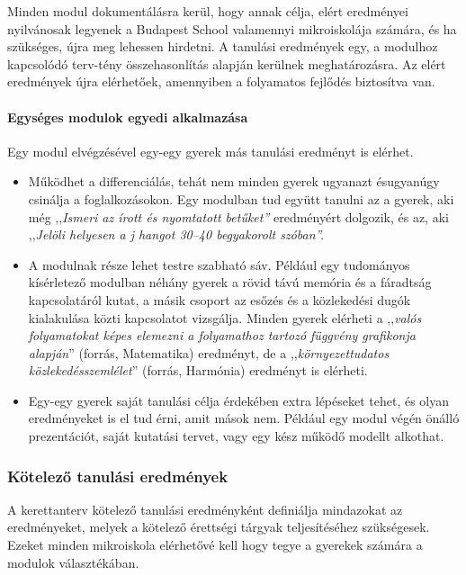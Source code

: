 Minden modul dokumentálásra kerül, hogy annak célja, elért eredményei nyilvánosak legyenek a Budapest School valamennyi mikroiskolája számára, és ha szükséges, újra meg lehessen hirdetni. A tanulási eredmények egy, a modulhoz kapcsolódó terv-tény összehasonlítás alapján kerülnek meghatározásra. Az elért eredmények újra elérhetőek, amennyiben a folyamatos fejlődés biztosítva van.

\paragraph{Egységes modulok egyedi alkalmazása}

Egy modul elvégzésével egy-egy gyerek más tanulási eredményt is elérhet.

\begin{itemize}
      \item
            Működhet a differenciálás, tehát nem minden gyerek ugyanazt és\break ugyanúgy csinálja a foglalkozásokon. Egy modulban tud együtt	tanulni az a gyerek, aki még ,,\emph{Ismeri az írott és nyomtatott  betűket''} eredményért dolgozik, és az, aki ,,\emph{Jelöli helyesen a j	hangot 30--40 begyakorolt szóban''.}
      \item
            A modulnak része lehet testre szabható sáv. Például egy tudományos kísérletező modulban néhány gyerek a rövid távú memória és a	fáradtság kapcsolatáról kutat, a másik csoport az esőzés és a	közlekedési dugók kialakulása közti kapcsolatot vizsgálja. Minden  gyerek elérheti a ,,\emph{valós folyamatokat képes elemezni a folyamathoz tartozó függvény grafikonja alapján}''  (forrás, Matematika) eredményt, de a ,,\emph{környezettudatos közlekedésszemlélet}'' (forrás, Harmónia)	eredményt is elérheti.
      \item
            Egy-egy gyerek saját tanulási célja érdekében extra lépéseket tehet, és olyan eredményeket is el tud érni, amit mások nem.	Például egy modul végén önálló prezentációt, saját kutatási  tervet, vagy egy kész működő modellt alkothat.
\end{itemize}

\subsubsection{Kötelező tanulási eredmények}
\label{sec:kotelezo_tanulasi_eredmenyek}
A kerettanterv kötelező tanulási eredményként definiálja mindazokat az eredményeket, melyek a kötelező érettségi tárgyak teljesítéséhez szükségesek. Ezeket minden mikroiskola elérhetővé kell hogy tegye a gyerekek számára a modulok választékában.

